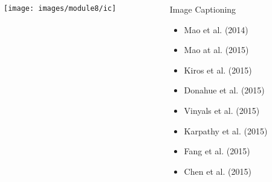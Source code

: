 \begin{frame}
	\begin{columns}
		\begin{column}{0.6\textwidth}
			\vspace{0.2in}
			\begin{overlayarea}{\textwidth}{\textheight}
				\texttt{[image: images/module8/ic]}
			\end{overlayarea}
		\end{column}

		\begin{column}{0.4\textwidth}
			\begin{overlayarea}{\textwidth}{\textheight}

				\begin{block}{Image Captioning
					}
					\begin{itemize}
						\item Mao et al. (2014) \cite{DBLP:journals/corr/MaoXYWY14a}
						\item Mao at al. (2015) \cite{Mao_2015_ICCV}
						\item Kiros et al. (2015) \cite{DBLP:journals/corr/KirosSZ14}
						\item Donahue et al. (2015) \cite{DBLP:conf/cvpr/DonahueHGRVDS15}
						\item Vinyals et al. (2015) \cite{DBLP:conf/cvpr/VinyalsTBE15}
						\item Karpathy et al. (2015) \cite{DBLP:conf/cvpr/KarpathyL15}
						\item Fang et al. (2015) \cite{DBLP:conf/cvpr/FangGISDDGHMPZZ15}
						\item Chen et al. (2015) \cite{DBLP:journals/corr/ChenWCGXN15}
					\end{itemize}
				\end{block}
			\end{overlayarea}
		\end{column}

	\end{columns}
\end{frame}

